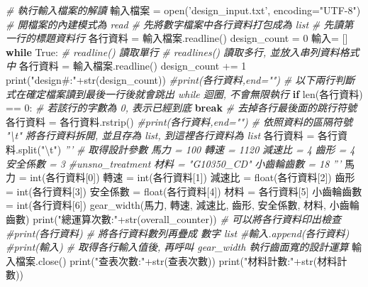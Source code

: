 \documentclass[]{article}
\newenvironment{Shaded}{}{}
\newcommand{\KeywordTok}[1]{\textcolor[rgb]{0.00,0.44,0.13}{\textbf{{#1}}}}
\newcommand{\DataTypeTok}[1]{\textcolor[rgb]{0.56,0.13,0.00}{{#1}}}
\newcommand{\DecValTok}[1]{\textcolor[rgb]{0.25,0.63,0.44}{{#1}}}
\newcommand{\CharTok}[1]{\textcolor[rgb]{0.25,0.44,0.63}{{#1}}}
\newcommand{\StringTok}[1]{\textcolor[rgb]{0.25,0.44,0.63}{{#1}}}
\newcommand{\CommentTok}[1]{\textcolor[rgb]{0.38,0.63,0.69}{\textit{{#1}}}}
\newcommand{\OtherTok}[1]{\textcolor[rgb]{0.00,0.44,0.13}{{#1}}}
\newcommand{\NormalTok}[1]{{#1}}
\begin{document}
\begin{Shaded}
\begin{Highlighting}[]
\CommentTok{# 執行輸入檔案的解讀}
\NormalTok{輸入檔案 = }\DataTypeTok{open}\NormalTok{(}\StringTok{'design_input.txt'}\NormalTok{, encoding=}\StringTok{"UTF-8"}\NormalTok{) }\CommentTok{# 開檔案的內建模式為 read}
\CommentTok{# 先將數字檔案中各行資料打包成為 list}
\CommentTok{# 先讀第一行的標題資料行}
\NormalTok{各行資料 = 輸入檔案.readline()}
\NormalTok{design_count = }\DecValTok{0}
\NormalTok{輸入= []}
\KeywordTok{while} \OtherTok{True}\NormalTok{:}
    \CommentTok{# readline() 讀取單行}
    \CommentTok{# readlines() 讀取多行, 並放入串列資料格式中}
    \NormalTok{各行資料 = 輸入檔案.readline()}
    \NormalTok{design_count += }\DecValTok{1}
    \DataTypeTok{print}\NormalTok{(}\StringTok{"design#:"}\NormalTok{+}\DataTypeTok{str}\NormalTok{(design_count))}
    \CommentTok{#print(各行資料,end="")}
    \CommentTok{# 以下兩行判斷式在確定檔案讀到最後一行後就會跳出 while 迴圈, 不會無限執行}
    \KeywordTok{if} \DataTypeTok{len}\NormalTok{(各行資料) == }\DecValTok{0}\NormalTok{: }\CommentTok{# 若該行的字數為 0, 表示已經到底}
        \KeywordTok{break}
    \CommentTok{# 去掉各行最後面的跳行符號}
    \NormalTok{各行資料 = 各行資料.rstrip()}
    \CommentTok{#print(各行資料,end="")}
    \CommentTok{# 依照資料的區隔符號 "\textbackslash{}t" 將各行資料拆開, 並且存為 list, 到這裡各行資料為 list}
    \NormalTok{各行資料 = 各行資料.split(}\StringTok{"}\CharTok{\textbackslash{}t}\StringTok{"}\NormalTok{)}
    \CommentTok{'''}
\CommentTok{    # 取得設計參數}
\CommentTok{    馬力 = 100}
\CommentTok{    轉速 = 1120}
\CommentTok{    減速比 = 4}
\CommentTok{    齒形 = 4}
\CommentTok{    安全係數 = 3}
\CommentTok{    #unsno_treatment}
\CommentTok{    材料 = "G10350_CD"}
\CommentTok{    小齒輪齒數 = 18}
\CommentTok{    '''}
    \NormalTok{馬力 = }\DataTypeTok{int}\NormalTok{(各行資料[}\DecValTok{0}\NormalTok{])}
    \NormalTok{轉速 = }\DataTypeTok{int}\NormalTok{(各行資料[}\DecValTok{1}\NormalTok{])}
    \NormalTok{減速比 = }\DataTypeTok{float}\NormalTok{(各行資料[}\DecValTok{2}\NormalTok{])}
    \NormalTok{齒形 = }\DataTypeTok{int}\NormalTok{(各行資料[}\DecValTok{3}\NormalTok{])}
    \NormalTok{安全係數 = }\DataTypeTok{float}\NormalTok{(各行資料[}\DecValTok{4}\NormalTok{])}
    \NormalTok{材料 = 各行資料[}\DecValTok{5}\NormalTok{]}
    \NormalTok{小齒輪齒數 = }\DataTypeTok{int}\NormalTok{(各行資料[}\DecValTok{6}\NormalTok{])}
    \NormalTok{gear_width(馬力, 轉速, 減速比, 齒形, 安全係數, 材料, 小齒輪齒數)}
\DataTypeTok{print}\NormalTok{(}\StringTok{"總運算次數:"}\NormalTok{+}\DataTypeTok{str}\NormalTok{(overall_counter))}
    \CommentTok{# 可以將各行資料印出檢查}
    \CommentTok{#print(各行資料)}
    \CommentTok{# 將各行資料數列再疊成 數字 list}
    \CommentTok{#輸入.append(各行資料)}
\CommentTok{#print(輸入)}
\CommentTok{# 取得各行輸入值後, 再呼叫 gear_width 執行齒面寬的設計運算}
\NormalTok{輸入檔案.close()}
\DataTypeTok{print}\NormalTok{(}\StringTok{"查表次數:"}\NormalTok{+}\DataTypeTok{str}\NormalTok{(查表次數))}
\DataTypeTok{print}\NormalTok{(}\StringTok{"材料計數:"}\NormalTok{+}\DataTypeTok{str}\NormalTok{(材料計數))}
\end{Highlighting}
\end{Shaded}
\end{document}
